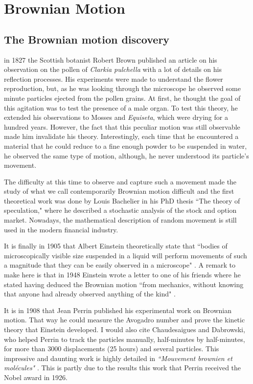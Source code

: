 \section{Brownian Motion}
\label{sec:chapter1}

\subsection{The Brownian motion discovery}



in 1827 the Scottish botanist Robert Brown published an article \cite{robert_xxvii_1828} on his observation on the pollen of \textit{Clarkia pulchella} with a lot of details on his reflection processes. His experiments were made to understand the flower reproduction, but, as he was looking through the microscope he observed some minute particles ejected from the pollen grains. At first, he thought the goal of this agitation was to test the presence of a male organ. To test this theory, he extended his observations to Mosses and \textit{Equiseta}, which were drying for a hundred years. However, the fact that this peculiar motion was still observable made him invalidate his theory. Interestingly, each time that he encountered a material that he could reduce to a fine enough powder to be suspended in water, he observed the same type of motion, although, he never understood its particle's movement.

The difficulty at this time to observe and capture such a movement made the study of what we call contemporarily Brownian motion difficult and the first theoretical work was done by Louis Bachelier in his PhD thesis ``The theory of speculation," where he described a stochastic analysis of the stock and option market. Nowadays, the mathematical description of random movement is still used in the modern financial industry. 

It is finally in 1905 that Albert Einstein theoretically state that ``bodies of microscopically visible size suspended in a liquid will perform movements of such a magnitude that they can be easily observed in a microscope" \cite{einstein_uber_1905}. A remark to make here is that in 1948 Einstein wrote a letter to one of his friends where he stated having deduced the Brownian motion ``from mechanics, without knowing that anyone had already observed anything of the kind" \cite{peter_brownian_nodate}.

It is in 1908 that Jean Perrin published his experimental work on Brownian motion. That way he could measure the Avogadro number and prove the kinetic theory that Einstein developed. I would also cite Chaudesaigues and Dabrowski, who helped Perrin to track the particles manually, half-minutes by half-minutes, for more than 3000 displacements (25 hours) and several particles. This impressive and daunting work is highly detailed in \textit{``Mouvement brownien et molécules"} \cite{perrin_mouvement_1910}. This is partly due to the results this work that Perrin received the Nobel award in 1926.

